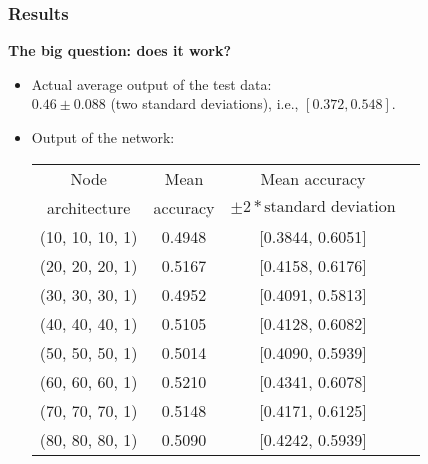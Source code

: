 \documentclass{beamer}
\numberwithin{equation}{section} %
\begin{document}
\begin{frame}
    \frametitle{Results}
    \textbf{The big question: does it work?}
    \begin{itemize}
        \item Actual average output of the test data:\\
        $0.46 \pm 0.088$ (two standard deviations), i.e., $[0.372, 0.548]$.
        \pause
        \item Output of the network:\\
            \begin{tabular}{|c|c|c|c|}
                \hline
                Node & Mean & Mean accuracy \\
                architecture & accuracy & $\pm 2*\text{standard deviation}$ \\
                \hline
                (10, 10, 10, 1) & 0.4948 & [0.3844, 0.6051]\\
                \hline
                (20, 20, 20, 1) & 0.5167  & [0.4158, 0.6176]\\
                \hline
                (30, 30, 30, 1) & 0.4952  & [0.4091, 0.5813]\\
                \hline
                (40, 40, 40, 1) & 0.5105  & [0.4128, 0.6082]\\
                \hline
                (50, 50, 50, 1) & 0.5014  & [0.4090, 0.5939]\\
                \hline
                (60, 60, 60, 1) & 0.5210  & [0.4341, 0.6078]\\
                \hline
                (70, 70, 70, 1) & 0.5148  & [0.4171, 0.6125]\\
                \hline
                (80, 80, 80, 1) & 0.5090  & [0.4242, 0.5939]\\
                \hline
            \end{tabular}
    \end{itemize}
\end{frame}
\end{document}

